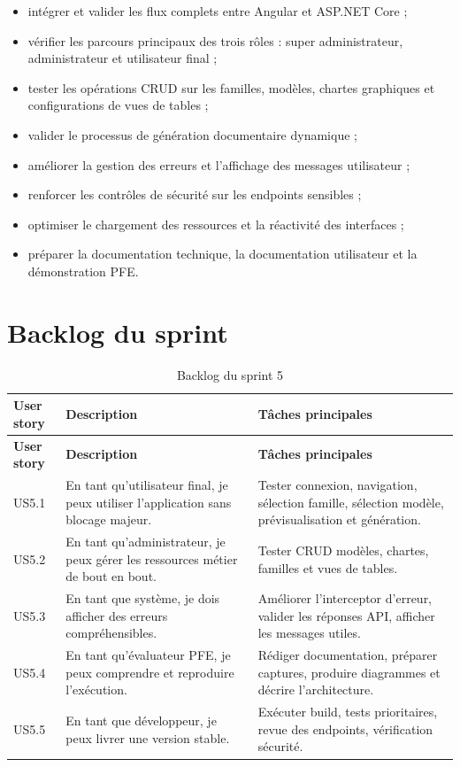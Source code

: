 \begin{itemize}
    \item intégrer et valider les flux complets entre Angular et ASP.NET Core ;
    \item vérifier les parcours principaux des trois rôles : super administrateur, administrateur et utilisateur final ;
    \item tester les opérations CRUD sur les familles, modèles, chartes graphiques et configurations de vues de tables ;
    \item valider le processus de génération documentaire dynamique ;
    \item améliorer la gestion des erreurs et l'affichage des messages utilisateur ;
    \item renforcer les contrôles de sécurité sur les endpoints sensibles ;
    \item optimiser le chargement des ressources et la réactivité des interfaces ;
    \item préparer la documentation technique, la documentation utilisateur et la démonstration PFE.
\end{itemize}

\section{Backlog du sprint}

\begin{longtable}{p{} p{} p{}}
\caption{Backlog du sprint 5}\\
\toprule
\textbf{User story} & \textbf{Description} & \textbf{Tâches principales}\\
\midrule
\endfirsthead
\toprule
\textbf{User story} & \textbf{Description} & \textbf{Tâches principales}\\
\midrule
\endhead
US5.1 & En tant qu'utilisateur final, je peux utiliser l'application sans blocage majeur. & Tester connexion, navigation, sélection famille, sélection modèle, prévisualisation et génération.\\
\midrule
US5.2 & En tant qu'administrateur, je peux gérer les ressources métier de bout en bout. & Tester CRUD modèles, chartes, familles et vues de tables.\\
\midrule
US5.3 & En tant que système, je dois afficher des erreurs compréhensibles. & Améliorer l'interceptor d'erreur, valider les réponses API, afficher les messages utiles.\\
\midrule
US5.4 & En tant qu'évaluateur PFE, je peux comprendre et reproduire l'exécution. & Rédiger documentation, préparer captures, produire diagrammes et décrire l'architecture.\\
\midrule
US5.5 & En tant que développeur, je peux livrer une version stable. & Exécuter build, tests prioritaires, revue des endpoints, vérification sécurité.\\
\bottomrule
\end{longtable}

